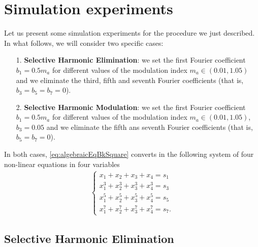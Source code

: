 \documentclass[a4paper]{article}
\numberwithin{equation}{section}
\begin{document}
\section{Simulation experiments}

Let us present some simulation experiments for the procedure we just described. In what follows, we will consider two specific cases:
\begin{itemize}
	\item[1.] \textbf{Selective Harmonic Elimination}: we set the first Fourier coefficient $b_1=0.5m_a$ for different values of the modulation index $m_a\in (0.01,1.05)$ and we eliminate the third, fifth and seventh Fourier coefficients (that is, $b_3=b_5=b_7=0$).
	
	\item[2.] \textbf{Selective Harmonic Modulation}: we set the first Fourier coefficient $b_1=0.5m_a$ for different values of the modulation index $m_a\in (0.01,1.05)$, $b_3=0.05$ and we eliminate the fifth ans seventh Fourier coefficients (that is, $b_5=b_7=0$).
\end{itemize}
In both cases, \eqref{eq:algebraicEqBkSquare} converts in the following system of four non-linear equations in four variables
\begin{align}\label{eq:algebraicEqBkExample}
	\begin{cases}
		\displaystyle x_1 + x_2 + x_3 + x_4 = s_1
		\\
		\displaystyle x_1^3 + x_2^3 + x_3^3 + x_4^3 = s_3
		\\
		\displaystyle x_1^5 + x_2^5 + x_3^5 + x_4^5 = s_5
		\\
		\displaystyle x_1^7 + x_2^7 + x_3^7 + x_4^7 = s_7.
	\end{cases}	
\end{align}

\subsection{Selective Harmonic Elimination}
\end{document}
